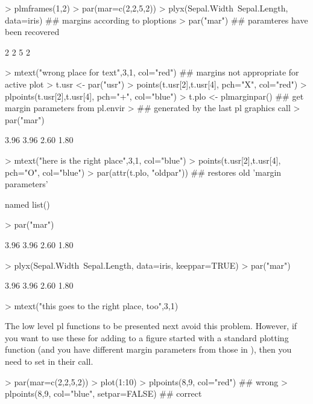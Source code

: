 \documentclass[11pt]{article}
\begin{document}
\begin{Schunk}
\begin{Sinput}
> plmframes(1,2)
> par(mar=c(2,2,5,2))
> plyx(Sepal.Width~Sepal.Length, data=iris) ## margins according to ploptions
> par("mar") ## paramteres have been recovered
\end{Sinput}
\begin{Soutput}
[1] 2 2 5 2
\end{Soutput}
\begin{Sinput}
> mtext("wrong place for text",3,1, col="red")  ## margins not appropriate for active plot
> t.usr <- par("usr")
> points(t.usr[2],t.usr[4], pch="X", col="red")
> plpoints(t.usr[2],t.usr[4], pch="+", col="blue")
> t.plo <- plmarginpar() ## get margin parameters from pl.envir 
>   ## generated by the last pl graphics call
> par("mar")
\end{Sinput}
\begin{Soutput}
[1] 3.96 3.96 2.60 1.80
\end{Soutput}
\begin{Sinput}
> mtext("here is the right place",3,1, col="blue")
> points(t.usr[2],t.usr[4], pch="O", col="blue")
> par(attr(t.plo, "oldpar"))  ## restores old 'margin parameters' 
\end{Sinput}
\begin{Soutput}
named list()
\end{Soutput}
\begin{Sinput}
> par("mar")
\end{Sinput}
\begin{Soutput}
[1] 3.96 3.96 2.60 1.80
\end{Soutput}
\begin{Sinput}
> plyx(Sepal.Width~Sepal.Length, data=iris, keeppar=TRUE)
> par("mar")
\end{Sinput}
\begin{Soutput}
[1] 3.96 3.96 2.60 1.80
\end{Soutput}
\begin{Sinput}
> mtext("this goes to the right place, too",3,1)
\end{Sinput}
\end{Schunk}

The low level pl functions to be presented next avoid this problem.
However, if you want to use these for adding to a figure started with
a standard plotting function (and you have different margin parameters
from those in ), then you need to set 
in their call.
\begin{Schunk}
\begin{Sinput}
> par(mar=c(2,2,5,2))
> plot(1:10)
> plpoints(8,9, col="red") ## wrong
> plpoints(8,9, col="blue", setpar=FALSE) ## correct
\end{Sinput}
\end{Schunk}
\end{document}

